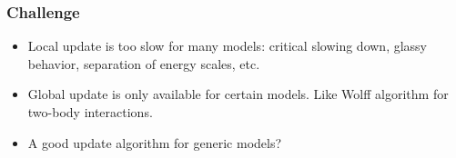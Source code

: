 \documentclass[xcolor=table, 10pt, aspectratio=169, ignorenonframetext]{beamer}
\begin{document}
\begin{frame}
  \frametitle{Challenge}
  \begin{itemize}
    \item Local update is too slow for many models: critical slowing down, glassy behavior, separation of energy scales, etc.
    \item Global update is only available for certain models. Like Wolff algorithm for two-body interactions.
    \item A good update algorithm for generic models?
  \end{itemize}
\end{frame}
\end{document}
